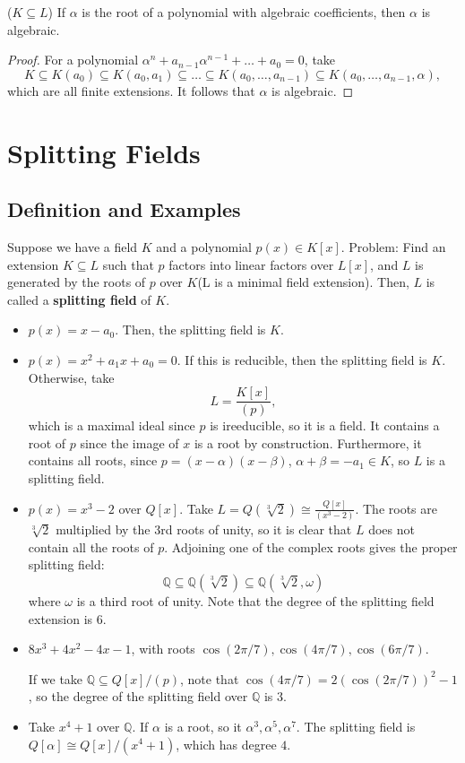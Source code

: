 \documentclass[11pt]{scrartcl}
\newcommand{\Q}{\mathbb{Q}}
\begin{document}
\begin{thm} ($K \subseteq L$) If $\alpha$ is the root of a polynomial with algebraic coefficients, then $\alpha$ is algebraic.
\end{thm}
\begin{proof}
For a polynomial $\alpha^n + a_{n-1}\alpha^{n-1} + \dots + a_0 = 0$, take
$$K \subseteq K(a_0) \subseteq K(a_0, a_1) \subseteq \dots \subseteq K(a_0, \dots, a_{n-1}) \subseteq K(a_0, \dots, a_{n-1}, \alpha),$$
which are all finite extensions.  It follows that $\alpha$ is algebraic.
\end{proof}
\pagebreak
\section{Splitting Fields}
\subsection{Definition and Examples}
Suppose we have a field $K$ and a polynomial $p(x) \in K[x]$.  Problem: Find an extension $K \subseteq L$ such that $p$ factors into linear factors over $L[x]$, and $L$ is generated by the roots of $p$ over $K$(L is a minimal field extension).  Then, $L$ is called a \textbf{splitting field} of $K$.

\begin{itemize}
\item $p(x) = x - a_0$.  Then, the splitting field is $K$.
\item $p(x) = x^2 + a_1x + a_0 = 0$.  If this is reducible, then the splitting field is $K$.  Otherwise, take
$$L = \frac{K[x]}{(p)},$$
which is a maximal ideal since $p$ is ireeducible, so it is a field.  It contains a root of $p$ since the image of $x$ is a root by construction.  Furthermore, it contains all roots, since $p = (x - \alpha)(x - \beta)$, $\alpha + \beta = -a_1 \in K$, so $L$ is a splitting field.
\item $p(x) = x^3 - 2$ over $Q[x]$.  Take $L = Q(\sqrt[3]{2}) \cong \frac{Q[x]}{(x^3 - 2)}.$  The roots are $\sqrt[3]{2}$ multiplied by the 3rd roots of unity, so it is clear that $L$ does not contain all the roots of $p$. Adjoining one of the complex roots gives the proper splitting field:
$$\Q \subseteq \Q(\sqrt[3]{2}) \subseteq \Q(\sqrt[3]{2}, \omega)$$
where $\omega $ is a third root of unity.  Note that the degree of the splitting field extension is $6$.
\item $8x^3 +4x^2 - 4x - 1$, with roots $\cos(2\pi/7), \cos(4\pi/7), \cos(6\pi/7)$.

If we take $\Q \subseteq Q[x]/(p)$, note that $\cos(4\pi/7) = 2(\cos(2\pi/7))^2 - 1$, so the degree of the splitting field over $\Q$ is $3$.
\item Take $x^4 + 1$ over $\Q$.  If $\alpha$ is a root, so it $\alpha^3, \alpha^5, \alpha^7$.  The splitting field is $Q[\alpha] \cong Q[x]/(x^4 + 1)$, which has degree $4$.
\end{itemize}
\end{document}
